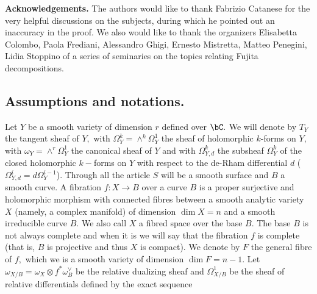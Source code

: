 \documentclass[a4paper,11pt]{amsart}
\begin{document}
{{\bf Acknowledgements.} The authors would like to thank Fabrizio Catanese for the very helpful discussions on the subjects, during which he pointed out an inaccuracy in the proof. We also would like to thank the organizers  Elisabetta Colombo, Paola Frediani, Alessandro Ghigi, Ernesto Mistretta, Matteo Penegini, Lidia Stoppino of a series of seminaries on the topics relating Fujita decompositions. 
\subsection*{Assumptions and notations.}\label{SusSec-GeneralitiesOnFibrations}
Let $Y$ be a smooth variety of dimension $r$ defined over $\bC.$ We will denote by $T_Y$ the tangent sheaf of $Y,$ with $\Omega^k_Y=\wedge^k\Omega^1_Y$  the sheaf of holomorphic $k$-forms on $Y,$ with $\omega_Y=\wedge^r\Omega^1_Y$ the canonical sheaf of $Y$ and with $\Omega^k_{Y,d}$ the subsheaf  $\Omega^k_Y$ of the closed holomorphic $k-$forms on $Y$ with respect to the de-Rham differential $d$ ($\Omega^i_{Y,d}= d\Omega^{i-1}_{Y}$). 
Through all the article $S$ will be a smooth surface and $B$ a smooth curve.  
A fibration $f:X\to B$ over a curve $B$ is a proper surjective and holomorphic morphism with connected fibres between a smooth analytic variety $X$ (namely, a complex manifold) of dimension $\dim X=n$ and a smooth irreducible curve $B.$ We also call $X$ a fibred space over the base $B.$ The base $B$ is not always complete and when it is we will say that the fibration $f$ is complete (that is, $B$ is projective and thus $X$ is compact). We denote by $F$ the general fibre  of $f,$ which we is a smooth variety of dimension $\dim F=n-1$.
Let $\omega_{X/B}=\omega_X\otimes f^*\omega_B^{\vee}$ be the relative dualizing sheaf and  $\Omega^1_{X/B}$ be the sheaf of relative differentials defined by the exact sequence
\begin{equation}\label{Ses-RelativeDifferentials}

\end{equation}}
\end{document}
